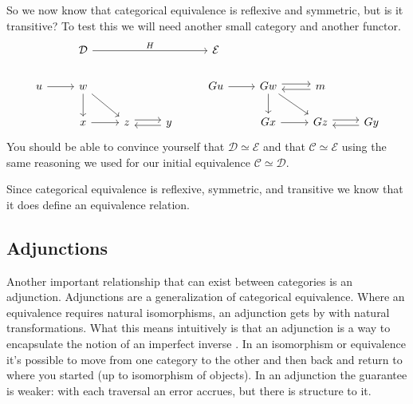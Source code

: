 \documentclass[12pt]{article}
\begin{document}
So we now know that categorical equivalence is reflexive and symmetric, but is it transitive?
To test this we will need another small category and another functor.
\[\begin{tikzcd}
        & {\mathcal{D}} &&& {\mathcal{E}} \\
        u & w &&& Gu & Gw & m \\
        & x & z & y && Gx & Gz & Gy
        \arrow["H", from=1-2, to=1-5]
        \arrow[from=2-1, to=2-2]
        \arrow[from=2-2, to=3-2]
        \arrow[from=2-2, to=3-3]
        \arrow[from=2-5, to=2-6]
        \arrow[shift left, from=2-6, to=2-7]
        \arrow[from=2-6, to=3-6]
        \arrow[from=2-6, to=3-7]
        \arrow[shift left, from=2-7, to=2-6]
        \arrow[from=3-2, to=3-3]
        \arrow[shift left, from=3-3, to=3-4]
        \arrow[shift left, from=3-4, to=3-3]
        \arrow[from=3-6, to=3-7]
        \arrow[shift left, from=3-7, to=3-8]
        \arrow[shift left, from=3-8, to=3-7]
    \end{tikzcd}\]
You should be able to convince yourself that $\mathcal{D}\simeq\mathcal{E}$ and that $\mathcal{C}\simeq\mathcal{E}$ using the same reasoning we used for our initial equivalence $\mathcal{C}\simeq\mathcal{D}$.

Since categorical equivalence is reflexive, symmetric, and transitive we know that it does define an equivalence relation.



\subsection*{Adjunctions}
Another important relationship that can exist between categories is an adjunction.
Adjunctions are a generalization of categorical equivalence.
Where an equivalence requires natural isomorphisms, an adjunction gets by with natural transformations.
What this means intuitively is that an adjunction is a way to encapsulate the notion of an imperfect inverse \cite{fong2019invitation}.
In an isomorphism or equivalence it's possible to move from one category to the other and then back and return to where you started (up to isomorphism of objects).
In an adjunction the guarantee is weaker: with each traversal an error accrues, but there is structure to it.
\end{document}
